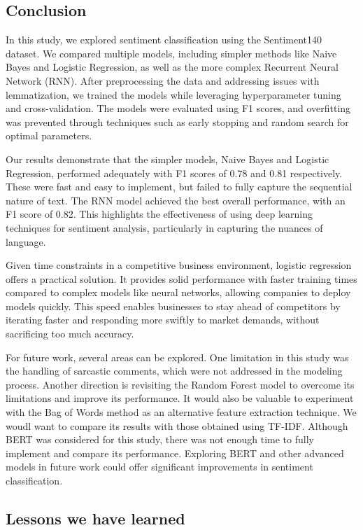 \documentclass{article}
\begin{document}
\begin{multicols}{2}
\section{Conclusion}

In this study, we explored sentiment classification using the Sentiment140 dataset. We compared multiple models, including simpler methods like Naive Bayes and Logistic Regression, as well as the more complex Recurrent Neural Network (RNN). After preprocessing the data and addressing issues with lemmatization, we trained the models while leveraging hyperparameter tuning and cross-validation. The models were evaluated using F1 scores, and overfitting was prevented through techniques such as early stopping and random search for optimal parameters.

Our results demonstrate that the simpler models, Naive Bayes and Logistic Regression, performed adequately with F1 scores of 0.78 and 0.81 respectively. These were fast and easy to implement, but failed to fully capture the sequential nature of text. The RNN model achieved the best overall performance, with an F1 score of 0.82. This highlights the effectiveness of using deep learning techniques for sentiment analysis, particularly in capturing the nuances of language.

Given time constraints in a competitive business environment, logistic regression offers a practical solution. It provides solid performance with faster training times compared to complex models like neural networks, allowing companies to deploy models quickly. This speed enables businesses to stay ahead of competitors by iterating faster and responding more swiftly to market demands, without sacrificing too much accuracy.

For future work, several areas can be explored. One limitation in this study was the handling of sarcastic comments, which were not addressed in the modeling process. Another direction is revisiting the Random Forest model to overcome its limitations and improve its performance. It would also be valuable to experiment with the Bag of Words method as an alternative feature extraction technique. We woudl want to compare its results with those obtained using TF-IDF. Although BERT was considered for this study, there was not enough time to fully implement and compare its performance. Exploring BERT and other advanced models in future work could offer significant improvements in sentiment classification.

\subsection{Lessons we have learned}


\end{multicols}
\end{document}

